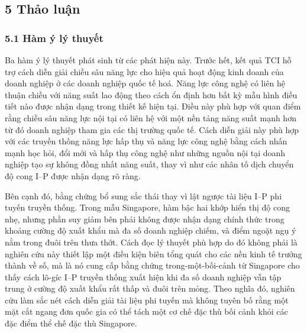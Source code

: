 \documentclass[12pt,a4paper]{article}
\begin{document}
\hypertarget{5-thux1ea3o-luux1eadn}{%
\subsection{5 Thảo luận}\label{5-thux1ea3o-luux1eadn}}

\hypertarget{51-huxe0m-uxfd-luxfd-thuyux1ebft}{%
\subsubsection{5.1 Hàm ý lý
thuyết}\label{51-huxe0m-uxfd-luxfd-thuyux1ebft}}

Ba hàm ý lý thuyết phát sinh từ các phát hiện này. Trước hết, kết quả
TCI hỗ trợ cách diễn giải chiều sâu năng lực cho hiệu quả hoạt động kinh
doanh của doanh nghiệp ở các doanh nghiệp quốc tế hoá. Năng lực công
nghệ có liên hệ thuận chiều với năng suất lao động theo cách ổn định hơn
bất kỳ mẫu hình điều tiết nào được nhận dạng trong thiết kế hiện tại.
Điều này phù hợp với quan điểm rằng chiều sâu năng lực nội tại có liên
hệ với một nền tảng năng suất mạnh hơn từ đó doanh nghiệp tham gia các
thị trường quốc tế. Cách diễn giải này phù hợp với các truyền thống năng
lực hấp thụ và năng lực công nghệ bằng cách nhấn mạnh học hỏi, đổi mới
và hấp thụ công nghệ như những nguồn nội tại doanh nghiệp tạo sự không
đồng nhất năng suất, thay vì như các nhân tố dịch chuyển độ cong I--P
được nhận dạng rõ ràng.

Bên cạnh đó, bằng chứng bổ sung sắc thái thay vì lật ngược tài liệu I--P
phi tuyến truyền thống. Trong mẫu Singapore, hàm bậc hai khớp hiển thị
độ cong nhẹ, nhưng phần suy giảm bên phải không được nhận dạng chính
thức trong khoảng cường độ xuất khẩu mà đa số doanh nghiệp chiếm, và
điểm ngoặt ngụ ý nằm trong đuôi trên thưa thớt. Cách đọc lý thuyết phù
hợp do đó không phải là nghiên cứu này thiết lập một điều kiện biên tổng
quát cho các nền kinh tế trưởng thành về số, mà là nó cung cấp bằng
chứng trong-một-bối-cảnh từ Singapore cho thấy cách lô-gíc I--P truyền
thống xuất hiện khi đa số doanh nghiệp vẫn tập trung ở cường độ xuất
khẩu rất thấp và đuôi trên mỏng. Theo nghĩa đó, nghiên cứu làm sắc nét
cách diễn giải tài liệu phi tuyến mà không tuyên bố rằng một mặt cắt
ngang đơn quốc gia có thể tách một cơ chế đặc thù bối cảnh khỏi các đặc
điểm thể chế đặc thù Singapore.
\end{document}
